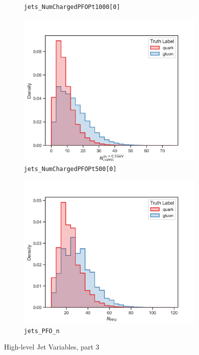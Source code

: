\begin{figure}[!htb]
\begin{subfigure}[t]{0.48\textwidth}
		\caption{\texttt{jets\_NumChargedPFOPt1000[0]}}
		\label{fig:highlevel_15}
	\end{subfigure}
	\begin{subfigure}[t]{0.48\textwidth}
		\includegraphics[width=1\textwidth]{src/plots/distributions/highlevel/jets_NumChargedPFOPt500[0].png}
		\caption{\texttt{jets\_NumChargedPFOPt500[0]}}
		\label{fig:highlevel_16}
	\end{subfigure}
	\begin{subfigure}[t]{0.48\textwidth}
		\includegraphics[width=1\textwidth]{src/plots/distributions/highlevel/jets_PFO_n.png}
		\caption{\texttt{jets\_PFO\_n}}
		\label{fig:highlevel_17}
	\end{subfigure}
\caption{High-level Jet Variables, part 3}
\label{fig:highlevel_12-17}
\end{figure}


